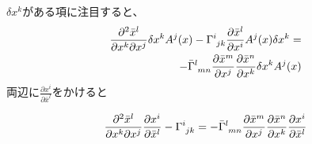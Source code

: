 \documentclass[dvipdfmx]{report} %
\begin{document}
$\delta x^k$がある項に注目すると、
\begin{eqnarray*}
\frac{\partial^2 \bar{x}^l}{\partial x^k \partial x^j} \delta x^k A^j(x) - \tensor{\Gamma}{^i_{jk}} \frac{\partial \bar{x}^l}{\partial x^i}A^j(x) \delta x^k = \\
- \tensor{\bar{\Gamma}}{^l_{mn}} \frac{\partial \bar{x}^m}{\partial x^j} \frac{\partial \bar{x}^n}{\partial x^k}\delta x^k A^j(x)
\end{eqnarray*}
両辺に$\frac{\partial x^i}{\partial \bar{x}^l}$をかけると
\begin{tcolorbox}
\begin{eqnarray*}
\frac{\partial^2 \bar{x}^l}{\partial x^k \partial x^j} \frac{\partial x^i}{\partial \bar{x}^l} - \tensor{\Gamma}{^i_{jk}} = - \tensor{\bar{\Gamma}}{^l_{mn}} \frac{\partial \bar{x}^m}{\partial x^j} \frac{\partial \bar{x}^n}{\partial x^k} \frac{\partial x^i}{\partial \bar{x}^l}
\end{eqnarray*}
\end{tcolorbox}
\end{document}

